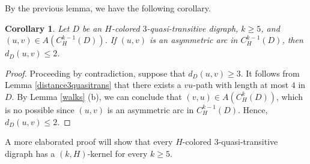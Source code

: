 \documentclass[10pt,a4paper]{article}
\newtheorem{cor}[theorem]{Corollary}
\begin{document}
By the previous lemma, we have the following corollary.

\begin{cor}
\label{geo3qt}
Let $D$ be an $H$-colored $3$-quasi-transitive digraph, $k \geq 5$, and $(u,v) \in A(C_{H}^{k-1}(D))$. If $(u,v)$ is an asymmetric arc in $C_{H}^{k-1}(D)$, then $d_{D}(u,v) \leq 2$.
\end{cor}
\begin{proof}
Proceeding by contradiction, suppose that $d_{D}(u,v) \geq 3$. It follows from Lemma \ref{distance3quasitrans} that there exists a $vu$-path with length at most $4$ in $D$. By Lemma \ref{walks} (b), we can conclude that $(v,u) \in A(C_{H}^{k}(D))$, which is no possible since $(u,v)$ is an asymmetric arc in $C_{H}^{k-1}(D)$. Hence, $d_{D}(u,v) \leq 2$. 
\end{proof}

A more elaborated proof will show that every $H$-colored $3$-quasi-transitive digraph has a $(k,H)$-kernel for every $k \geq 5$.
\end{document}
